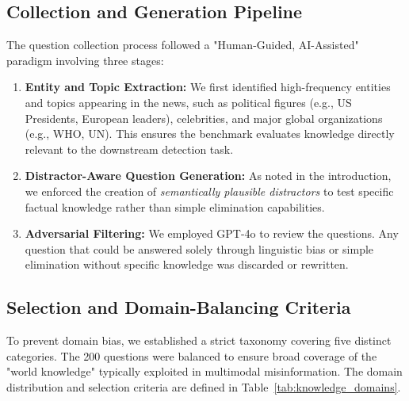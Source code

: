 \documentclass{article}
\theoremstyle{plain}
\theoremstyle{definition}
\theoremstyle{remark}
\begin{document}
\subsection{Collection and Generation Pipeline}
The question collection process followed a "Human-Guided, AI-Assisted" paradigm involving three stages:
\begin{enumerate}
    \item \textbf{Entity and Topic Extraction:} We first identified high-frequency entities and topics appearing in the news, such as political figures (e.g., US Presidents, European leaders), celebrities, and major global organizations (e.g., WHO, UN). This ensures the benchmark evaluates knowledge directly relevant to the downstream detection task.
    \item \textbf{Distractor-Aware Question Generation:} As noted in the introduction, we enforced the creation of \textit{semantically plausible distractors} to test specific factual knowledge rather than simple elimination capabilities.
    \item \textbf{Adversarial Filtering:} We employed GPT-4o to review the questions. Any question that could be answered solely through linguistic bias or simple elimination without specific knowledge was discarded or rewritten.
\end{enumerate}

\subsection{Selection and Domain-Balancing Criteria}
To prevent domain bias, we established a strict taxonomy covering five distinct categories. The 200 questions were balanced to ensure broad coverage of the "world knowledge" typically exploited in multimodal misinformation. The domain distribution and selection criteria are defined in Table~\ref{tab:knowledge_domains}.
\end{document}
